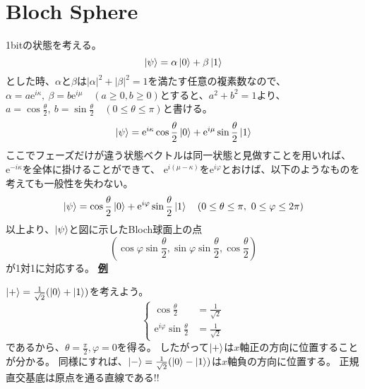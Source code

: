\documentclass[b5paper,fleqn]{ltjsarticle}
\newcommand\ex{\mathrm{e}}
\begin{document}
\section{Bloch Sphere}
\par
1bitの状態を考える。
\[\ket{\psi}=\alpha\ket{0}+\beta\ket{1}\]
とした時、$\alpha$と$\beta$は$|\alpha|^2+|\beta|^2=1$を満たす任意の複素数なので、
$\alpha=a\ex^{i\kappa},\ \beta=b\ex^{i\mu}\quad(a\geq0, b\geq0)$とすると、$a^2+b^2=1$より、
$a=\cos\frac{\theta}{2},\ b=\sin\frac{\theta}{2}\quad(0\leq\theta\leq\pi)$と書ける。
\[\ket{\psi}=\ex^{i\kappa}\cos\frac{\theta}{2}\ket{0}+\ex^{i\mu}\sin\frac{\theta}{2}\ket{1}\]
ここでフェーズだけが違う状態ベクトルは同一状態と見做すことを用いれば、$\ex^{-i\kappa}$を全体に掛けることができて、
$\ex^{i(\mu-\kappa)}$を$\ex^{i\varphi}$とおけば、以下のようなものを考えても一般性を失わない。
\[\ket{\psi}=\cos\frac{\theta}{2}\ket{0}+\ex^{i\varphi}\sin\frac{\theta}{2}\ket{1}\quad 
(0\leq\theta\leq\pi,\ 0\leq\varphi\leq2\pi)\]
以上より、$\ket{\psi}$と図に示したBloch球面上の点
\[(\cos\varphi\sin\frac{\theta}{2} ,\sin\varphi\sin\frac{\theta}{2}, \cos\frac{\theta}{2})\]
が1対1に対応する。\vskip5pt
\underline{\bf 例}\par\noindent
$\ket{+}=\frac{1}{\sqrt{2}}(\ket{0}+\ket{1})$を考えよう。
\[\begin{cases}
  \cos\frac{\theta}{2}&=\frac{1}{\sqrt{2}}\\
  \ex^{i\varphi}\sin\frac{\theta}{2}&=\frac{1}{\sqrt{2}}
  \end{cases}
\]
であるから、$\theta=\frac{\pi}{2}, \varphi=0$を得る。
したがって$\ket{+}$は$x$軸正の方向に位置することが分かる。
同様にすれば、$\ket{-}=\frac{1}{\sqrt{2}}(\ket{0}-\ket{1})$は$x$軸負の方向に位置する。
正規直交基底は原点を通る直線である!!
\end{document}
